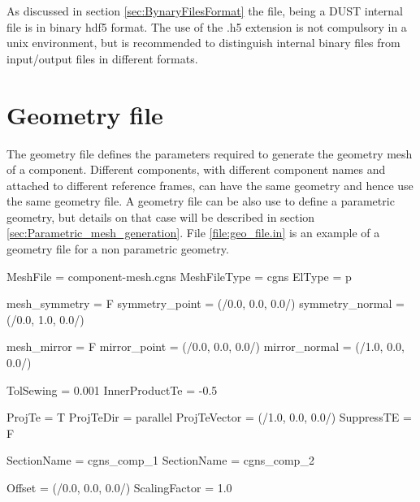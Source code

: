 As discussed in section \ref{sec:BynaryFilesFormat} the file, being a DUST internal file is in binary hdf5 format. The use of the .h5 extension is not compulsory in a unix environment, but is recommended to distinguish internal binary files from input/output files in different formats.

\section{Geometry file}
The geometry file defines the parameters required to generate the geometry mesh of a component. Different components, with different component names and attached to different reference frames, can have the same geometry and hence use the same geometry file. A geometry file can be also use to define a parametric geometry, but details on that case will be described in section \ref{sec:Parametric_mesh_generation}. File \ref{file:geo_file.in} is an example of a geometry file for a non parametric geometry.

\begin{inputfile}[frame=single, caption={geo\_file.in}, label={file:geo_file.in}]
MeshFile = component-mesh.cgns
MeshFileType = cgns
ElType = p

mesh_symmetry = F
symmetry_point  = (/0.0, 0.0, 0.0/)
symmetry_normal = (/0.0, 1.0, 0.0/)

mesh_mirror = F
mirror_point  = (/0.0, 0.0, 0.0/)
mirror_normal = (/1.0, 0.0, 0.0/)

TolSewing  = 0.001
InnerProductTe = -0.5

ProjTe = T
ProjTeDir = parallel
ProjTeVector = (/1.0, 0.0, 0.0/)
SuppressTE = F

SectionName = cgns_comp_1
SectionName = cgns_comp_2

Offset = (/0.0, 0.0, 0.0/)
ScalingFactor = 1.0
\end{inputfile}


